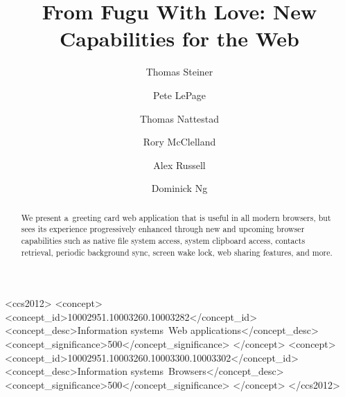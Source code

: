 \documentclass[sigconf]{acmart}
\begin{document}
\title{From Fugu With Love: New Capabilities for the Web}

\author{Thomas Steiner}

\author{Pete LePage}

\author{Thomas Nattestad}
\author{Rory McClelland}

\author{Alex Russell}

\author{Dominick Ng}

\renewcommand{\shortauthors}{Thomas Steiner, Pete LePage, Thomas Nattestad, \textit{et al.}}

\begin{abstract}
We present a~greeting card web application that is useful in all modern browsers,
but sees its experience progressively enhanced through new and upcoming browser capabilities
such as native file system access, system clipboard access, contacts retrieval,
periodic background sync, screen wake lock, web sharing features, and more.
\end{abstract}

\begin{CCSXML}
<ccs2012>
<concept>
<concept_id>10002951.10003260.10003282</concept_id>
<concept_desc>Information systems~Web applications</concept_desc>
<concept_significance>500</concept_significance>
</concept>
<concept>
<concept_id>10002951.10003260.10003300.10003302</concept_id>
<concept_desc>Information systems~Browsers</concept_desc>
<concept_significance>500</concept_significance>
</concept>
</ccs2012>
\end{CCSXML}

\end{document}
